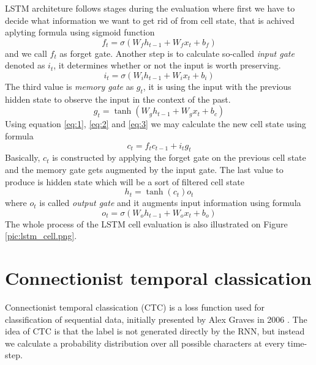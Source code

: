 LSTM architeture follows stages during the evaluation where first we have to decide what information we want to get rid of from cell state, that is achived aplyting formula using sigmoid function
\begin{equation} \label{eq:1}
  f_t = {\sigma}({W_f}{h_{t-1}} + {W_f}{x_t} + b_f)
\end{equation}
and we call $f_t$ as forget gate.
Another step is to calculate so-called \textit{input gate} denoted as $i_t$, it determines whether or not the input is worth preserving.
\begin{equation} \label{eq:2}
  i_t = {\sigma}({W_i}{h_{t-1}} + {W_i}{x_t} + b_i)
\end{equation}
The third value is \textit{memory gate} as ${g_t}$, it is using the input with the previous hidden state to observe the input in the context of the past.
\begin{equation} \label{eq:3}
  {g_t} = {\tanh}({W_g}{h_{t-1}} + {W_g}{x_t} + b_c)
\end{equation}
Using equation \ref{eq:1}, \ref{eq:2} and \ref{eq:3} we may calculate the new cell state using formula
\begin{equation} \label{eq:4}
  {c_t} = {f_t}{c_{t-1}} + {i_t}{g_t}
\end{equation}
Basically, $c_t$ is constructed by applying the forget gate on the previous cell state and the memory gate gets augmented by the input gate.
The last value to produce is hidden state which will be a sort of filtered cell state
\begin{equation} \label{eq:5}
  {h_t} = {\tanh}(c_t)o_t
\end{equation}
where $o_t$ is called \textit{output gate} and it augments input information using formula
\begin{equation} \label{eq:6}
  {o_t} = {\sigma}({W_o}{h_{t-1}} + {W_o}{x_t} + b_o)
\end{equation}
The whole process of the LSTM cell evaluation is also illustrated on Figure \ref{pic:lstm_cell.png}.


\section{Connectionist temporal classication}

Connectionist temporal classication (CTC) is a loss function used for classification of sequential data, initially presented by Alex Graves in 2006 \cite{ctc}.
The idea of CTC is that the label is not generated directly by the RNN, but instead we calculate a probability distribution over all possible characters at every time-step.

